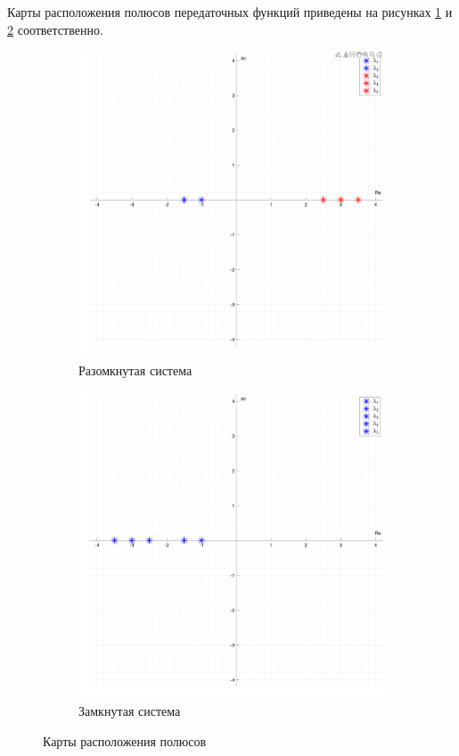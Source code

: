 Карты расположения полюсов передаточных функций приведены на рисунках \ref{fig:task3_poles:open} и \ref{fig:task3_poles:closed} соответственно.
\begin{figure}
    \centering
    \begin{subfigure}{0.5\textwidth}
        \includegraphics[width=\textwidth]{media/plots/task3_poles_open.png}
        \caption{Разомкнутая система}
        \label{fig:task3_poles:open}
    \end{subfigure}%
    \begin{subfigure}{0.5\textwidth}
        \includegraphics[width=\textwidth]{media/plots/task3_poles_closed.png}
        \caption{Замкнутая система}
        \label{fig:task3_poles:closed}
    \end{subfigure}
    \caption{Карты расположения полюсов}
    \label{fig:task3_poles}
\end{figure}

